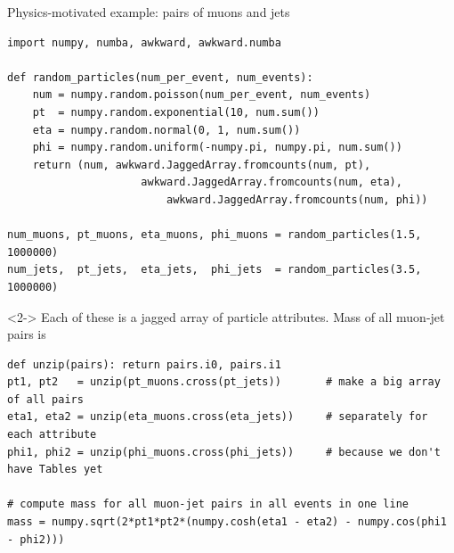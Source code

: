 \documentclass[aspectratio=169]{beamer}
\begin{document}
\begin{frame}[fragile]{Physics-motivated example: pairs of muons and jets}
\vspace{0.15 cm}
\scriptsize
\begin{verbatim}
import numpy, numba, awkward, awkward.numba

def random_particles(num_per_event, num_events):
    num = numpy.random.poisson(num_per_event, num_events)
    pt  = numpy.random.exponential(10, num.sum())
    eta = numpy.random.normal(0, 1, num.sum())
    phi = numpy.random.uniform(-numpy.pi, numpy.pi, num.sum())
    return (num, awkward.JaggedArray.fromcounts(num, pt),
                     awkward.JaggedArray.fromcounts(num, eta),
                         awkward.JaggedArray.fromcounts(num, phi))

num_muons, pt_muons, eta_muons, phi_muons = random_particles(1.5, 1000000)
num_jets,  pt_jets,  eta_jets,  phi_jets  = random_particles(3.5, 1000000)
\end{verbatim}

\vspace{0.35 cm}
\begin{uncoverenv}<2->
{\normalsize Each of these is a jagged array of particle attributes. Mass of all muon-jet pairs is}

\vspace{0.1 cm}
\begin{verbatim}
def unzip(pairs): return pairs.i0, pairs.i1
pt1, pt2   = unzip(pt_muons.cross(pt_jets))       # make a big array of all pairs
eta1, eta2 = unzip(eta_muons.cross(eta_jets))     # separately for each attribute
phi1, phi2 = unzip(phi_muons.cross(phi_jets))     # because we don't have Tables yet

# compute mass for all muon-jet pairs in all events in one line
mass = numpy.sqrt(2*pt1*pt2*(numpy.cosh(eta1 - eta2) - numpy.cos(phi1 - phi2)))
\end{verbatim}
\end{uncoverenv}
\end{frame}
\end{document}

